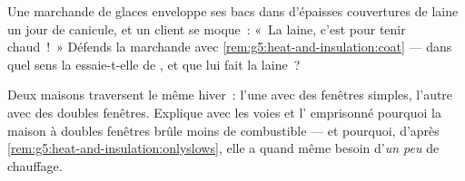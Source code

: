 \begin{exercise}[$\star\star$]\label{exo:g5:heat-and-insulation:10}
Une marchande de glaces enveloppe ses bacs dans d'épaisses
couvertures de laine un jour de canicule, et un client se moque~:
«~La laine, c'est pour tenir chaud~!~» Défends la marchande avec
\cref{rem:g5:heat-and-insulation:coat} --- dans quel sens la 
essaie-t-elle de , et que lui fait la laine~?
\end{exercise}

\begin{exercise}[$\star\star$]\label{exo:g5:heat-and-insulation:11}
Deux maisons traversent le même hiver~: l'une avec des fenêtres
simples, l'autre avec des doubles fenêtres. Explique avec les voies
et l' emprisonné pourquoi la maison à doubles fenêtres brûle moins
de combustible --- et pourquoi, d'après
\cref{rem:g5:heat-and-insulation:onlyslows}, elle a quand même besoin
d'\emph{un peu} de chauffage.
\end{exercise}
